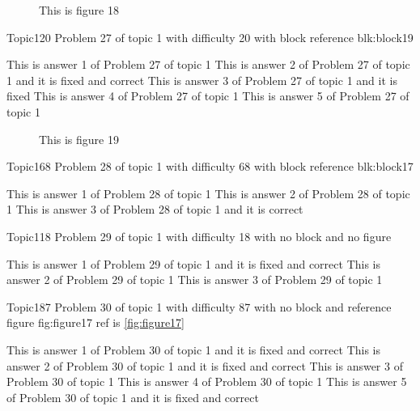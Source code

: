 \documentclass[master]{exam}
\begin{document}
\begin{figure}
	\begin{center}
		This is figure 18 
		\label{fig:figure18}
	\end{center}
\end{figure}

\begin{problem}[requires=blk:block19]{Topic1}{20}
	Problem 27 of topic 1 with difficulty 20 with block reference blk:block19
	\begin{answers}
		\answer This is answer 1 of Problem 27 of topic 1 
		 This is answer 2 of Problem 27 of topic 1 and it is fixed and correct
		\answer[fixed] This is answer 3 of Problem 27 of topic 1 and it is fixed
		\answer This is answer 4 of Problem 27 of topic 1 
		\answer This is answer 5 of Problem 27 of topic 1 
	\end{answers}
\end{problem}



\begin{figure}
	\begin{center}
		This is figure 19 
		\label{fig:figure19}
	\end{center}
\end{figure}

\begin{problem}[requires=blk:block17]{Topic1}{68}
	Problem 28 of topic 1 with difficulty 68 with block reference blk:block17
	\begin{answers}
		\answer This is answer 1 of Problem 28 of topic 1 
		\answer This is answer 2 of Problem 28 of topic 1 
		\answer[correct] This is answer 3 of Problem 28 of topic 1 and it is correct
	\end{answers}
\end{problem}

\begin{problem}{Topic1}{18}
	Problem 29 of topic 1 with difficulty 18 with no block and no figure
	\begin{answers}
		 This is answer 1 of Problem 29 of topic 1 and it is fixed and correct
		\answer This is answer 2 of Problem 29 of topic 1 
		\answer This is answer 3 of Problem 29 of topic 1 
	\end{answers}
\end{problem}

\begin{problem}{Topic1}{87}
	Problem 30 of topic 1 with difficulty 87 with no block and reference figure fig:figure17 ref is \ref{fig:figure17}
	\begin{answers}
		 This is answer 1 of Problem 30 of topic 1 and it is fixed and correct
		 This is answer 2 of Problem 30 of topic 1 and it is fixed and correct
		\answer This is answer 3 of Problem 30 of topic 1 
		\answer This is answer 4 of Problem 30 of topic 1 
		 This is answer 5 of Problem 30 of topic 1 and it is fixed and correct
	\end{answers}
\end{problem}
\end{document}
